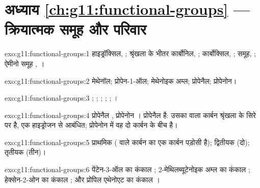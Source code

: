 \section*{अध्याय \ref{ch:g11:functional-groups} --- क्रियात्मक समूह और परिवार}

\begin{solution}{exo:g11:functional-groups:1}
हाइड्रॉक्सिल, ; श्रृंखला के भीतर कार्बोनिल, ; कार्बोक्सिल,
;  समूह, ; ऐमीनो समूह , ।
\end{solution}

\begin{solution}{exo:g11:functional-groups:2}
मेथेनॉल; प्रोपेन-1-ऑल; मेथेनोइक अम्ल; प्रोपेनैल; प्रोपेनोन।
\end{solution}

\begin{solution}{exo:g11:functional-groups:3}
; ; ; ; ; ।
\end{solution}

\begin{solution}{exo:g11:functional-groups:4}
प्रोपेनैल , प्रोपेनोन । प्रोपेनैल
 है: उसका  वाला कार्बन श्रृंखला के सिरे पर है, एक हाइड्रोजन
 से आबंधित; प्रोपेनोन में वह दो कार्बन  के बीच है।
\end{solution}

\begin{solution}{exo:g11:functional-groups:5}
प्राथमिक ( वाले कार्बन का एक कार्बन पड़ोसी है);
द्वितीयक (दो); तृतीयक (तीन)।
\end{solution}

\begin{solution}{exo:g11:functional-groups:6}
पेंटेन-3-ऑल का कंकाल ;
2-मेथिलब्यूटेनोइक अम्ल का कंकाल ;
हेक्सेन-2-ओन का कंकाल ;
और प्रोपिल एथेनोएट का कंकाल ।
\end{solution}

